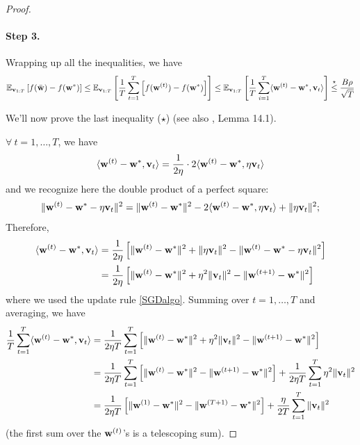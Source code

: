 \documentclass{article}
\begin{document}
\begin{proof}
\paragraph{ Step 3.} 

Wrapping up all the inequalities, we have
\begin{gather}
\mathbb{E}_{{\bf v}_{1:T}} \left[ f(\bar{\bf w}) - f({\bf w}^\ast) \right] \leq \mathbb{E}_{{\bf v}_{1:T}} \left[ \dfrac{1}{T}  \sum_{t=1}^T\left[  f({\bf w}^{(t)}) -  f({\bf w}^\ast) \right] \right] \leq  \mathbb{E}_{{\bf v}_{1:T}} \left[\dfrac{1}{T} \sum_{i=1}^T \langle {\bf w}^{(t)} - {\bf w}^\ast, {\bf v}_t\rangle \right] \stackrel{\star}{\leq} \dfrac{B\rho}{\sqrt{T}}
\end{gather}
 
 We'll now prove the last inequality ($\star$) (see also \cite{Shalev2014}, Lemma 14.1).
 
 $\forall \ t=1,\ldots, T$, we have
 \begin{gather}
 \langle {\bf w}^{(t)} - {\bf w}^\ast, {\bf v}_t\rangle = \dfrac{1}{2\eta} \cdot 2 \langle {\bf w}^{(t)} - {\bf w}^\ast, \eta {\bf v}_t\rangle
 \end{gather}
and  we recognize here the double product of a perfect square: 
 \begin{gather}
 \| {\bf w}^{(t)} - {\bf w}^\ast - \eta{\bf v}_t  \|^2 =  \| {\bf w}^{(t)} - {\bf w}^\ast \|^2 - 2  \langle {\bf w}^{(t)} - {\bf w}^\ast , \eta {\bf v}_t \rangle  + \|\eta {\bf v}_t  \|^2;
 \end{gather}
 Therefore, 
  \begin{align}
 \langle {\bf w}^{(t)} - {\bf w}^\ast, {\bf v}_t\rangle &= \dfrac{1}{2\eta} \left[    \| {\bf w}^{(t)} - {\bf w}^\ast \|^2   + \|\eta {\bf v}_t  \|^2 -  \| {\bf w}^{(t)} - {\bf w}^\ast - \eta{\bf v}_t  \|^2 \right] \nonumber \\
 &= \dfrac{1}{2\eta} \left[    \| {\bf w}^{(t)} - {\bf w}^\ast \|^2   + \eta^2 \| {\bf v}_t  \|^2 -  \| {\bf w}^{(t+1)} - {\bf w}^\ast   \|^2 \right]
 \end{align}
 where we used the update rule \ref{SGDalgo}. Summing over $t=1,\ldots, T$ and averaging, we have
 \begin{align}
\dfrac{1}{T} \sum_{t=1}^T  \langle {\bf w}^{(t)} - {\bf w}^\ast, {\bf v}_t\rangle &= \dfrac{1}{2\eta T} \sum_{t=1}^T   \left[    \| {\bf w}^{(t)} - {\bf w}^\ast \|^2   + \eta^2 \| {\bf v}_t  \|^2 -  \| {\bf w}^{(t+1)} - {\bf w}^\ast   \|^2 \right] \nonumber \\
&=  \dfrac{1}{2\eta T} \sum_{t=1}^T   \left[    \| {\bf w}^{(t)} - {\bf w}^\ast \|^2    -  \| {\bf w}^{(t+1)} - {\bf w}^\ast   \|^2 \right] + \dfrac{1}{2\eta T} \sum_{t=1}^T  \eta^2 \| {\bf v}_t  \|^2 \nonumber \\
&=  \dfrac{1}{2\eta T}   \left[    \| {\bf w}^{(1)} - {\bf w}^\ast \|^2    -  \| {\bf w}^{(T+1)} - {\bf w}^\ast   \|^2 \right] + \dfrac{\eta}{2T} \sum_{t=1}^T   \| {\bf v}_t  \|^2
 \end{align}
 (the first sum over the ${\bf w}^{(t)}$'s is a telescoping sum).
 

\end{proof}
\end{document}
